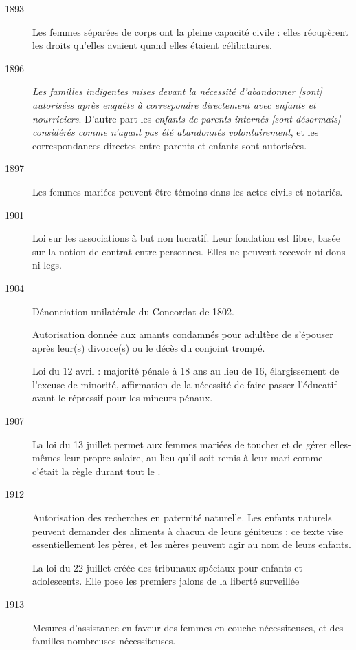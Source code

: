 \begin{description}
\item[1893] Les femmes séparées de corps ont la pleine capacité civile : elles récupèrent les droits qu'elles avaient quand elles étaient célibataires.

\item[1896] {\emph{Les familles indigentes mises devant la nécessité d'abandonner \emph{[sont]} autorisées après enquête à correspondre directement avec enfants et nourriciers}}. D'autre part les {\emph{enfants de parents internés \emph{[sont désormais]} considérés comme n'ayant pas été abandonnés volontairement}}, et les correspondances directes entre parents et enfants sont autorisées.

\item[1897] Les femmes mariées peuvent être témoins dans les actes civils et notariés.

\item[1901] Loi sur les associations à but non lucratif. Leur fondation est libre, basée sur la notion de contrat entre personnes. Elles ne peuvent recevoir ni dons ni legs.

\item[1904] Dénonciation unilatérale du Concordat de 1802.

Autorisation donnée aux amants condamnés pour adultère de s'épouser après leur(s) divorce(s) ou le décès du conjoint trompé.

 Loi du 12 avril : majorité pénale à 18 ans au lieu de 16, élargissement de l'excuse de minorité, affirmation de la nécessité de faire passer l'éducatif avant le répressif pour les mineurs pénaux.

\item[1907] La loi du 13 juillet permet aux femmes mariées de toucher et de gérer elles-mêmes leur propre salaire, au lieu qu'il soit remis à leur mari comme c'était la règle durant tout le . 

\item[1912] Autorisation des recherches en paternité naturelle. Les enfants naturels peuvent demander des aliments à chacun de leurs géniteurs : ce texte vise essentiellement les pères, et les mères peuvent agir au nom de leurs enfants. 

La loi du 22 juillet créée des tribunaux spéciaux pour enfants et adolescents. Elle pose les premiers jalons de la liberté surveillée

\item[1913] Mesures d'assistance en faveur des femmes en couche nécessiteuses, et des familles nombreuses nécessiteuses.


\end{description}
